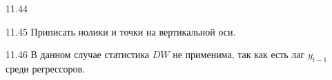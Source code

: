 \protect \hypertarget {soln:11.44}{}
\begin{solution}{{11.44}}
\end{solution}
\protect \hypertarget {soln:11.45}{}
\begin{solution}{{11.45}}
Приписать нолики и точки на вертикальной оси.
\end{solution}
\protect \hypertarget {soln:11.46}{}
\begin{solution}{{11.46}}
В данном случае статистика $DW$ не применима, так как есть лаг $y_{t-1}$ среди регрессоров.
\end{solution}
